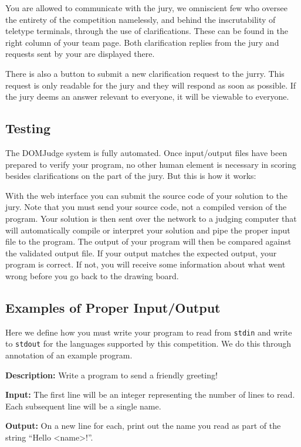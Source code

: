 \documentclass[a4paper]{article}
\begin{document}
You are allowed to communicate with the jury, we omniscient few who oversee the entirety of the competition namelessly, and behind the inscrutability of teletype terminals, through the use of clarifications. These can be found in the right column of your team page. Both clarification replies from the jury and requests sent by your are displayed there. 

There is also a button to submit a new clarification request to the jurry. This request is only readable for the jury and they will respond as soon as possible. If the jury deems an answer relevant to everyone, it will be viewable to everyone. 

\subsection{Testing}
The DOMJudge system is fully automated. Once input/output files have been prepared to verify your program, no other human element is necessary in scoring besides clarifications on the part of the jury. But this is how it works:

With the web interface you can submit the source code of your solution to the jury. Note that you must send your source code, not a compiled version of the program. Your solution is then sent over the network to a judging computer that will automatically compile or interpret your solution and pipe the proper input file to the program. The output of your program will then be compared against the validated output file. If your output matches the expected output, your program is correct. If not, you will receive some information about what went wrong before you go back to the drawing board. 

\subsection{Examples of Proper Input/Output}
Here we define how you must write your program to read from \texttt{stdin} and write to \texttt{stdout} for the languages supported by this competition. We do this through annotation of an example program.

\textbf{Description:} Write a program to send a friendly greeting! 

\textbf{Input:} The first line will be an integer representing the number of lines to read. Each subsequent line will be a single name.

\textbf{Output:} On a new line for each, print out the name you read as part of the string ``Hello \textless name\textgreater!''.
\end{document}
